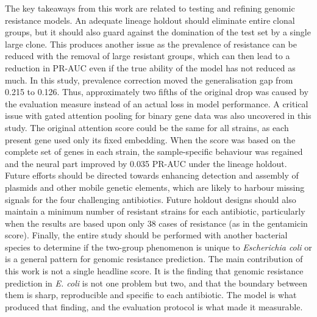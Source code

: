 The key takeaways from this work are related to testing and refining genomic
resistance models. An adequate lineage holdout should eliminate entire clonal groups,
but it should also guard against the domination of the test set by a single large
clone. This produces another issue as the prevalence of resistance can be reduced
with the removal of large resistant groups, which can then lead to a reduction in
PR-AUC even if the true ability of the model has not reduced as much. In this study,
prevalence correction moved the generalisation gap from 0.215 to 0.126. Thus,
approximately two fifths of the original drop was caused by the evaluation measure
instead of an actual loss in model performance. A critical issue with gated attention
pooling for binary gene data was also uncovered in this study. The original attention
score could be the same for all strains, as each present gene used only its fixed
embedding. When the score was based on the complete set of genes in each strain, the
sample-specific behaviour was regained and the neural part improved by 0.035 PR-AUC
under the lineage holdout. Future efforts should be directed towards enhancing
detection and assembly of plasmids and other mobile genetic elements, which are
likely to harbour missing signals for the four challenging antibiotics. Future
holdout designs should also maintain a minimum number of resistant strains for each
antibiotic, particularly when the results are based upon only 38 cases of resistance
(as in the gentamicin score). Finally, the entire study should be performed with
another bacterial species to determine if the two-group phenomenon is unique to
\textit{Escherichia coli} or is a general pattern for genomic resistance prediction.
The main contribution of this work is not a single headline score. It is the finding
that genomic resistance prediction in \textit{E. coli} is not one problem but two,
and that the boundary between them is sharp, reproducible and specific to each
antibiotic. The model is what produced that finding, and the evaluation protocol is
what made it measurable.
